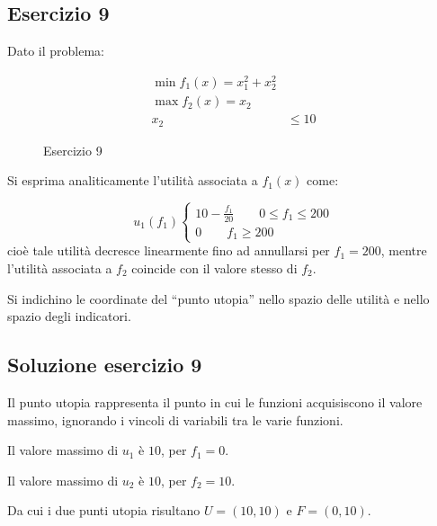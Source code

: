 \documentclass[\main/main.tex]{subfiles}
\begin{document}
\subsection{Esercizio 9}
Dato il problema:

\begin{figure}
  \begin{align*}
    \min f_1(x) = x_1^2 + x_2^2 \\
    \max f_2(x) = x_2           \\
    x_2 & \leq 10
  \end{align*}
  \caption{Esercizio 9}
\end{figure}

Si esprima analiticamente l'utilità associata a $f_1(x)$ come:

\[
  u_1(f_1)\begin{cases}
    10 - \frac{f_1}{20} \qquad 0 \leq f_1 \leq 200 \\
    0 \qquad f_1 \geq 200
  \end{cases}
\]
cioè tale utilità decresce linearmente fino ad annullarsi per $f_1 = 200$, mentre l'utilità
associata a $f_2$ coincide con il valore stesso di $f_2$.

Si indichino le coordinate del “punto utopia” nello spazio delle utilità e nello spazio degli indicatori.

\subsection{Soluzione esercizio 9}
Il punto utopia rappresenta il punto in cui le funzioni acquisiscono il valore massimo, ignorando i vincoli di variabili tra le varie funzioni.

Il valore massimo di $u_1$ è $10$, per $f_1=0$.

Il valore massimo di $u_2$ è $10$, per $f_2=10$.

Da cui i due punti utopia risultano $U=(10,10)$ e $F=(0,10)$.
\end{document}
